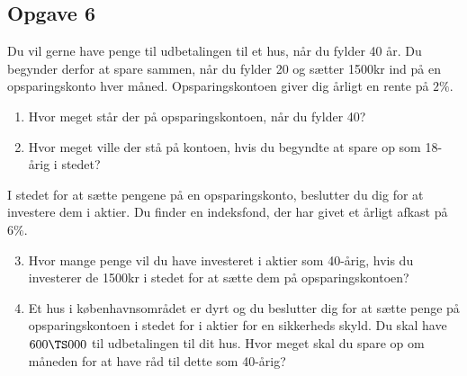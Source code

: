 \subsection*{Opgave 6}
Du vil gerne have penge til udbetalingen til et hus, når du fylder 40 år. Du begynder derfor at spare sammen, når du fylder 20 og sætter 1500kr ind på en opsparingskonto hver måned. Opsparingskontoen giver dig årligt en rente på $2\%$.
\begin{enumerate}[label=\roman*)]
	\item Hvor meget står der på opsparingskontoen, når du fylder 40?
	\item Hvor meget ville der stå på kontoen, hvis du begyndte at spare op som 18-årig i stedet?
\end{enumerate}
I stedet for at sætte pengene på en opsparingskonto, beslutter du dig for at investere dem i aktier. Du finder en indeksfond, der har givet et årligt afkast på $6\%$. 
\begin{enumerate}[label=\roman*)]
	\setcounter{enumi}{2}
	\item Hvor mange penge vil du have investeret i aktier som 40-årig, hvis du investerer de 1500kr 
	i stedet for at sætte dem på opsparingskontoen?
	\item Et hus i københavnsområdet er dyrt og du beslutter dig for at sætte penge på opsparingskontoen i stedet for i aktier for en sikkerheds skyld. Du skal have $600\TS 000$ til udbetalingen til dit hus. Hvor meget skal du spare op om måneden for at have råd til dette som 40-årig?
\end{enumerate}

